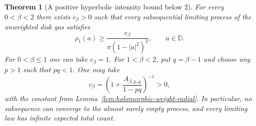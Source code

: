 \documentclass[11pt,a4paper]{article}
\numberwithin{equation}{section}
\newtheorem{theorem}{Theorem}[section]
\theoremstyle{definition}
\theoremstyle{remark}
\newcommand{\D}{\mathbb D}
\begin{document}
\begin{theorem}[A positive hyperbolic intensity bound below $2$]
\label{thm:nonemptiness-below-two}
For every $0<\beta<2$ there exists $c_\beta>0$ such that every
subsequential limiting process of the unweighted disk gas satisfies
\begin{equation}
 \rho_1(a)\ge
 \frac{c_\beta}{\pi(1-|a|^2)^2},\qquad a\in\D.
 \label{eq:nonemptiness-below-two}
\end{equation}
For $0<\beta\le1$ one can take $c_\beta=1$. For $1<\beta<2$, put
$q=\beta-1$ and choose any $p>1$ such that $pq<1$. One may take
\begin{equation}
 c_\beta=
 \left(1+\frac{A_{\beta,p,q}}{1-pq}\right)^{-1}>0,
 \label{eq:nonemptiness-below-two-constant}
\end{equation}
with the constant from Lemma~\ref{lem:holomorphic-weight-radial}.
In particular, no subsequence can converge to the almost surely
empty process, and every limiting law has infinite expected total
count.
\end{theorem}
\end{document}
